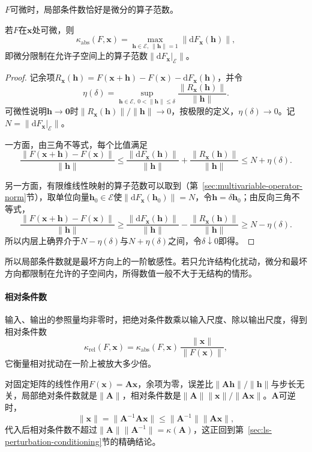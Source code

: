 $F$可微时，局部条件数恰好是微分的算子范数。
\begin{theorem}[可微映射的局部条件数]
\label{thm:multivariable-local-condition-number}
若$F$在$\bm x$处可微，则
\begin{equation}
 \kappa_{\mathrm{abs}}(F,\bm x)=\max_{\bm h\in\mathcal E,\ \lVert\bm h\rVert=1}\lVert\mathrm dF_{\bm x}(\bm h)\rVert,
\label{eq:multivariable-local-condition-derivative-norm}
\end{equation}
即微分限制在允许子空间上的算子范数$\lVert\mathrm dF_{\bm x}|_{\mathcal E}\rVert$。
\end{theorem}
\begin{proof}
记余项$R_{\bm x}(\bm h)=F(\bm x+\bm h)-F(\bm x)-\mathrm dF_{\bm x}(\bm h)$，并令
\[
 \eta(\delta)=\sup_{\bm h\in\mathcal E,\ 0<\lVert\bm h\rVert\leq\delta}\frac{\lVert R_{\bm x}(\bm h)\rVert}{\lVert\bm h\rVert}.
\]
可微性说明$\bm h\to\bm0$时$\lVert R_{\bm x}(\bm h)\rVert/\lVert\bm h\rVert\to0$，按极限的定义，$\eta(\delta)\to0$。记$N=\lVert\mathrm dF_{\bm x}|_{\mathcal E}\rVert$。

一方面，由三角不等式，每个比值满足
\[
 \frac{\lVert F(\bm x+\bm h)-F(\bm x)\rVert}{\lVert\bm h\rVert}
 \leq\frac{\lVert\mathrm dF_{\bm x}(\bm h)\rVert}{\lVert\bm h\rVert}+\frac{\lVert R_{\bm x}(\bm h)\rVert}{\lVert\bm h\rVert}
 \leq N+\eta(\delta).
\]

另一方面，有限维线性映射的算子范数可以取到（第~\ref{sec:multivariable-operator-norm}节），取单位向量$\bm h_0\in\mathcal E$使$\lVert\mathrm dF_{\bm x}(\bm h_0)\rVert=N$，令$\bm h=\delta\bm h_0$；由反向三角不等式，
\[
 \frac{\lVert F(\bm x+\bm h)-F(\bm x)\rVert}{\lVert\bm h\rVert}
 \geq\frac{\lVert\mathrm dF_{\bm x}(\bm h)\rVert}{\lVert\bm h\rVert}-\frac{\lVert R_{\bm x}(\bm h)\rVert}{\lVert\bm h\rVert}
 \geq N-\eta(\delta).
\]
所以内层上确界介于$N-\eta(\delta)$与$N+\eta(\delta)$之间，令$\delta\downarrow0$即得。
\end{proof}
所以局部条件数就是最坏方向上的一阶敏感性。若只允许结构化扰动，微分和最坏方向都限制在允许的子空间内，所得数值一般不大于无结构的情形。

\paragraph{相对条件数}
输入、输出的参照量均非零时，把绝对条件数乘以输入尺度、除以输出尺度，得到相对条件数
\[
 \kappa_{\mathrm{rel}}(F,\bm x)=\kappa_{\mathrm{abs}}(F,\bm x)\,\frac{\lVert\bm x\rVert}{\lVert F(\bm x)\rVert},
\]
它衡量相对扰动在一阶上被放大多少倍。

对固定矩阵的线性作用$F(\bm x)=\bm A\bm x$，余项为零，误差比$\lVert\bm A\bm h\rVert/\lVert\bm h\rVert$与步长无关，局部绝对条件数就是$\lVert\bm A\rVert$，相对条件数是$\lVert\bm A\rVert\lVert\bm x\rVert/\lVert\bm A\bm x\rVert$。$\bm A$可逆时，
\[
 \lVert\bm x\rVert=\lVert\bm A^{-1}\bm A\bm x\rVert\leq\lVert\bm A^{-1}\rVert\lVert\bm A\bm x\rVert,
\]
代入后相对条件数不超过$\lVert\bm A\rVert\lVert\bm A^{-1}\rVert=\kappa(\bm A)$，这正回到第~\ref{sec:ls-perturbation-conditioning}节的精确结论。

